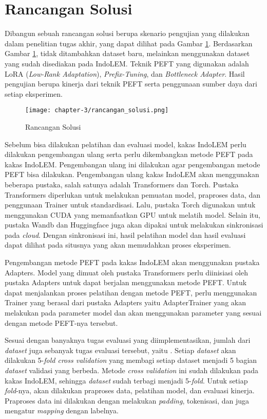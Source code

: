 \section{Rancangan Solusi}

Dibangun sebuah rancangan solusi berupa skenario pengujian yang dilakukan dalam penelitian tugas akhir, yang dapat dilihat pada Gambar \ref{fig:rancangan-solusi}. Berdasarkan Gambar \ref{fig:rancangan-solusi}, tidak ditambahkan dataset baru, melainkan menggunakan dataset yang sudah disediakan pada IndoLEM. Teknik PEFT yang digunakan adalah LoRA (\textit{Low-Rank Adaptation}), \textit{Prefix-Tuning}, dan \textit{Bottleneck Adapter}. Hasil pengujian berupa kinerja dari teknik PEFT serta penggunaan sumber daya dari setiap eksperimen.

\begin{figure}[ht]
    \centering
    \texttt{[image: chapter-3/rancangan\_solusi.png]}
    \caption{Rancangan Solusi}
    \label{fig:rancangan-solusi}
\end{figure}

Sebelum bisa dilakukan pelatihan dan evaluasi model, kakas IndoLEM perlu dilakukan pengembangan ulang serta perlu dikembangkan metode PEFT pada kakas IndoLEM. Pengembangan ulang ini dilakukan agar pengembangan metode PEFT bisa dilakukan. Pengembangan ulang kakas IndoLEM akan menggunakan beberapa pustaka, salah satunya adalah Transformers dan Torch. Pustaka Transformers diperlukan untuk melakukan pemuatan model, praproses data, dan penggunaan Trainer untuk standardisasi. Lalu, pustaka Torch digunakan untuk menggunakan CUDA yang memanfaatkan GPU untuk melatih model. Selain itu, pustaka Wandb dan Huggingface juga akan dipakai untuk melakukan sinkronisasi pada \textit{cloud}. Dengan sinkronisasi ini, hasil pelatihan model dan hasil evaluasi dapat dilihat pada situsnya yang akan memudahkan proses eksperimen. 

Pengembangan metode PEFT pada kakas IndoLEM akan menggunakan pustaka Adapters. Model yang dimuat oleh pustaka Transformers perlu diinisiasi oleh pustaka Adapters untuk dapat berjalan menggunakan metode PEFT. Untuk dapat menjalankan proses pelatihan dengan metode PEFT, perlu menggunakan Trainer yang berasal dari pustaka Adapters yaitu AdapterTrainer yang akan melakukan  pada parameter model dan akan menggunakan parameter yang sesuai dengan metode PEFT-nya tersebut.

Sesuai dengan banyaknya tugas evaluasi yang diimplementasikan, jumlah dari \textit{dataset} juga sebanyak tugas evaluasi tersebut, yaitu \nlptask. Setiap \textit{dataset} akan dilakukan 5-\textit{fold cross validation} yang membagi setiap dataset menjadi 5 bagian \textit{dataset} validasi yang berbeda. Metode \textit{cross validation} ini sudah dilakukan pada kakas IndoLEM, sehingga \textit{dataset} sudah terbagi menjadi 5-\textit{fold}. Untuk setiap \textit{fold}-nya,  akan dilakukan praproses data, pelatihan model, dan evaluasi kinerja. Praproses data ini dilakukan dengan melakukan \textit{padding}, tokenisasi, dan juga mengatur \textit{mapping} dengan labelnya. 

